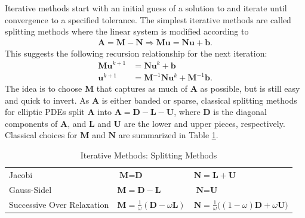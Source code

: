 Iterative methods start with an initial guess of a solution to  and iterate until convergence to a specified tolerance. The simplest iterative methods are called splitting methods where the linear system is modified according to
\begin{align}
\textbf{A} = \textbf{M} - \textbf{N} \Rightarrow \textbf{M} \textbf{u} = \textbf{N} \textbf{u} + \textbf{b}.
\end{align}
This suggests the following recursion relationship for the next iteration:
\begin{align}
\textbf{M} \textbf{u}^{k+1} &= \textbf{N} \textbf{u}^k + \textbf{b} \\
\textbf{u}^{k+1} &= \textbf{M}^{-1} \textbf{N} \textbf{u}^k + \textbf{M}^{-1} \textbf{b}.
\end{align}
The idea is to choose $\textbf{M}$ that captures as much of $\textbf{A}$ as possible, but is still easy and quick to invert. As $\textbf{A}$ is either banded or sparse, classical splitting methods for elliptic PDEs split $\textbf{A}$ into $\textbf{A} = \textbf{D} - \textbf{L} - \textbf{U}$, where $\textbf{D}$ is the diagonal components of $\textbf{A}$, and $\textbf{L}$ and $\textbf{U}$ are the lower and upper pieces, respectively. Classical choices for $\textbf{M}$ and $\textbf{N}$ are summarized in Table \ref{tab:splitting}.

\begin{table}[h!]
    \centering
    \caption{Iterative Methods: Splitting Methods}
    \begin{tabular}{ | l | l | l |}
        \hline
        Jacobi & $\textbf{M} = \textbf{D}$ & $\textbf{N} = \textbf{L} + \textbf{U}$ \\
        Gauss-Sidel & $\textbf{M} = \textbf{D} - \textbf{L}$ & $\textbf{N} = \textbf{U}$ \\
        Successive Over Relaxation & $\textbf{M} = \frac{1}{\omega}(\textbf{D} - \omega \textbf{L})$ & $\textbf{N} = \frac{1}{\omega} \big( (1 - \omega) \textbf{D} + \omega \textbf{U} \big)$ \\
        \hline
    \end{tabular}
    \label{tab:splitting}
\end{table}

